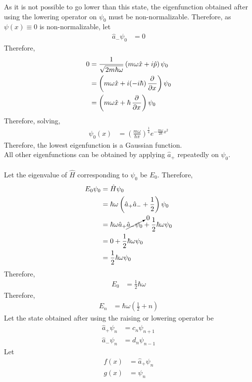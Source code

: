 \documentclass[titlepage, fleqn, a4paper, 12pt, twoside]{article}
\theoremstyle{definition}
\theoremstyle{theorem}
\begin{document}
As it is not possible to go lower than this state, the eigenfunction obtained after using the lowering operator on $\psi_0$ must be non-normalizable.
Therefore, as $\psi(x) \equiv 0$ is non-normalizable, let
\begin{align*}
	\hat{a}_- \psi_0 &= 0
\end{align*}
Therefore,
\begin{align*}
	0 &= \frac{1}{\sqrt{2 m \hbar \omega}} \left( m \omega \hat{x} + i \hat{p} \right) \psi_0\\
	&= \left( m \omega \hat{x} + i (-i \hbar) \dpd{}{x} \right) \psi_0\\
	&= \left( m \omega \hat{x} + \hbar \dpd{}{x} \right) \psi_0
\end{align*}
Therefore, solving,
\begin{align*}
	\psi_0(x) &= \left( \frac{m \omega}{\hbar \pi} \right)^{\frac{1}{4}} e^{-\frac{m \omega}{2 \hbar} x^2}
\end{align*}
Therefore, the lowest eigenfunction is a Gaussian function.\\
All other eigenfunctions can be obtained by applying $\hat{a}_+$ repeatedly on $\psi_0$.\\
~\\
Let the eigenvalue of $\hat{H}$ corresponding to $\psi_0$ be $E_0$.
Therefore,
\begin{align*}
	E_0 \psi_0 &= \hat{H} \psi_0\\
	&= \hbar \omega \left( \hat{a}_+ \hat{a}_- + \frac{1}{2} \right) \psi_0\\
	&= \hbar \omega \hat{a}_+ \cancelto{0}{\hat{a}_- \psi_0} + \frac{1}{2} \hbar \omega \psi_0\\
	&= 0 + \frac{1}{2} \hbar \omega \psi_0\\
	&= \frac{1}{2} \hbar \omega \psi_0
\end{align*}
Therefore,
\begin{align*}
	E_0 &= \frac{1}{2} \hbar \omega
\end{align*}
Therefore,
\begin{align*}
	E_n &= \hbar \omega \left( \frac{1}{2} + n \right)
\end{align*}
Let the state obtained after using the raising or lowering operator be
\begin{align*}
	\hat{a}_+ \psi_n &= c_n \psi_{n + 1}\\
	\hat{a}_- \psi_n &= d_n \psi_{n - 1}
\end{align*}
Let
\begin{align*}
	f(x) &= \hat{a}_+ \psi_n\\
	g(x) &= \psi_n
\end{align*}
\end{document}
